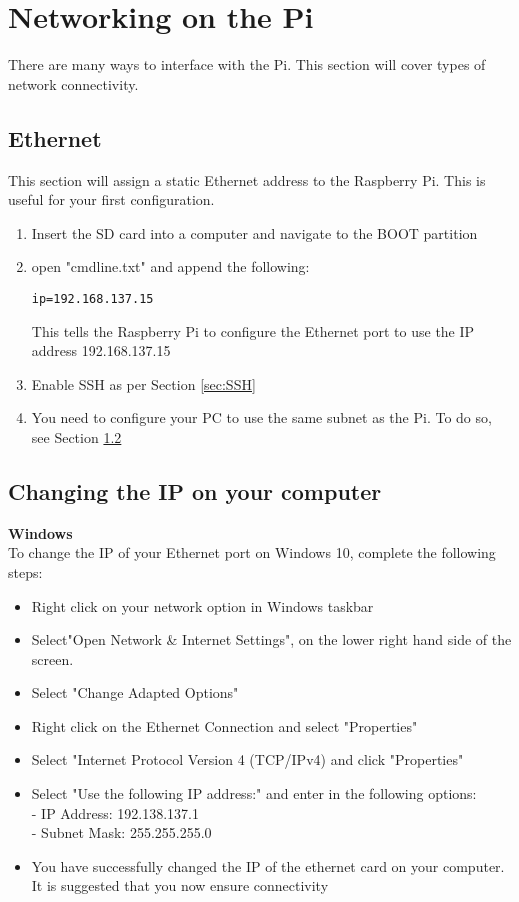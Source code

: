\section{Networking on the Pi}
\label{app:NetworkingOnThePi}
There are many ways to interface with the Pi. This section will cover types of network connectivity.

\subsection{Ethernet}
\label{sec:Connectivity-Ethernet}
This section will assign a static Ethernet address to the Raspberry Pi. This is useful for your first configuration.
\begin{enumerate}
    \item Insert the SD card into a computer and navigate to the BOOT partition
    \item open "cmdline.txt" and append the following:
        \begin{verbatim}ip=192.168.137.15\end{verbatim} 
        This tells the Raspberry Pi to configure the Ethernet port to use the IP address 192.168.137.15
    \item Enable SSH as per Section \ref{sec:SSH}
    \item You need to configure your PC to use the same subnet as the Pi. To do so, see Section \ref{sec:Connectivity-ChangeComputerIP}
\end{enumerate}

\subsection{Changing the IP on your computer}
\label{sec:Connectivity-ChangeComputerIP}
\textbf{Windows}\\
To change the IP of your Ethernet port on Windows 10, complete the following steps:
\begin{itemize}
    \item Right click on your network option in Windows taskbar
    \item Select"Open Network \& Internet Settings", on the lower right hand side of the screen.
    \item Select "Change Adapted Options"
    \item Right click on the Ethernet Connection and select "Properties"
    \item Select "Internet Protocol Version 4 (TCP/IPv4) and click "Properties"
    \item Select "Use the following IP address:" and enter in the following options:\\
            - IP Address: 192.138.137.1\\
            - Subnet Mask: 255.255.255.0
    \item You have successfully changed the IP of the ethernet card on your computer. It is suggested that you now ensure connectivity
\end{itemize}


